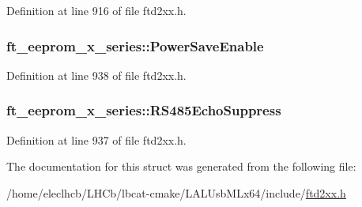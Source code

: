 Definition at line 916 of file ftd2xx.h.\hypertarget{structft__eeprom__x__series_adb0618ee1305d47abec850be8f315ed4}{
\subsubsection[{PowerSaveEnable}]{ {\bf ft\_\-eeprom\_\-x\_\-series::PowerSaveEnable}}}
\label{structft__eeprom__x__series_adb0618ee1305d47abec850be8f315ed4}


Definition at line 938 of file ftd2xx.h.\hypertarget{structft__eeprom__x__series_a1c3a9dc30091091132b7ec653676f589}{
\subsubsection[{RS485EchoSuppress}]{ {\bf ft\_\-eeprom\_\-x\_\-series::RS485EchoSuppress}}}
\label{structft__eeprom__x__series_a1c3a9dc30091091132b7ec653676f589}


Definition at line 937 of file ftd2xx.h.

The documentation for this struct was generated from the following file:\begin{DoxyCompactItemize}
\item 
/home/eleclhcb/LHCb/lbcat-\/cmake/LALUsbMLx64/include/\hyperlink{LALUsbMLx64_2include_2ftd2xx_8h}{ftd2xx.h}\end{DoxyCompactItemize}
